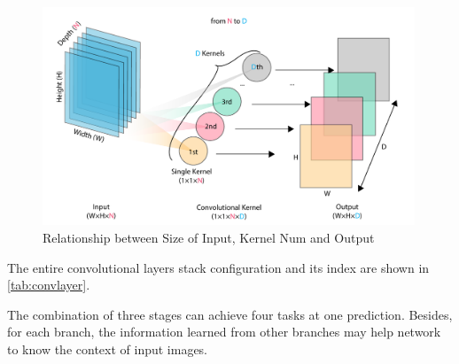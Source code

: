 \begin{spacing}{1.5}
\begin{figure}[ht]
\centering
\includegraphics[width=0.99\textwidth, fbox]{Chapter3/oneonekernel.pdf}
\caption{Relationship between Size of Input, Kernel Num and Output}
\label{fig:oneonekernel} 
\end{figure}

The entire convolutional layers stack configuration and its index are shown in \autoref{tab:convlayer}.

\begin{table}[ht]
\centering
\caption{Convolutional Layers and Pooling Configuration}
\label{tab:convlayer}
\end{table}

The combination of three stages can achieve four tasks at one prediction. Besides, for each branch, the information learned from other branches may help network to know the context of input images.


\end{spacing}
